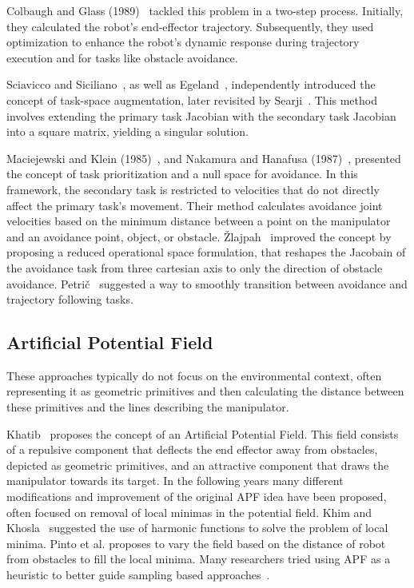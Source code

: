 \documentclass[]{article}
\begin{document}
Colbaugh and Glass (1989)~\cite{c31, c32} tackled this problem in a two-step process. Initially, they calculated the robot's end-effector trajectory. Subsequently, they used optimization to enhance the robot's dynamic response during trajectory execution and for tasks like obstacle avoidance.

Sciavicco and Siciliano~\cite{c34, c35}, as well as Egeland~\cite{c36}, independently introduced the concept of task-space augmentation, later revisited by Searji~\cite{c37}. This method involves extending the primary task Jacobian with the secondary task Jacobian into a square matrix, yielding a singular solution.

Maciejewski and Klein (1985)~\cite{c29}, and Nakamura and Hanafusa (1987)~\cite{c38}, presented the concept of task prioritization and a null space for avoidance. In this framework, the secondary task is restricted to velocities that do not directly affect the primary task's movement. Their method calculates avoidance joint velocities based on the minimum distance between a point on the manipulator and an avoidance point, object, or obstacle. Žlajpah~\cite{c41} improved the concept by proposing a reduced operational space formulation, that reshapes the Jacobain of the avoidance task from three cartesian axis to only the direction of obstacle avoidance. Petrič~\cite{c42} suggested a way to smoothly transition between avoidance and trajectory following tasks.

\subsection{Artificial Potential Field}

These approaches typically do not focus on the environmental context, often representing it as geometric primitives and then calculating the distance between these primitives and the lines describing the manipulator.

Khatib~\cite{c33} proposes the concept of an Artificial Potential Field. This field consists of a repulsive component that deflects the end effector away from obstacles, depicted as geometric primitives, and an attractive component that draws the manipulator towards its target. In the following years many different modifications and improvement of the original APF idea have been proposed, often focused on removal of local minimas in the potential field. Khim and Khosla~\cite{c40} suggested the use of harmonic functions to solve the problem of local minima. Pinto et al. \cite{c43} proposes to vary the field based on the distance of robot from obstacles to fill the local minima. Many researchers tried using APF as a heuristic to better guide sampling based approaches~\cite{c45, c46, c47}.
\end{document}
